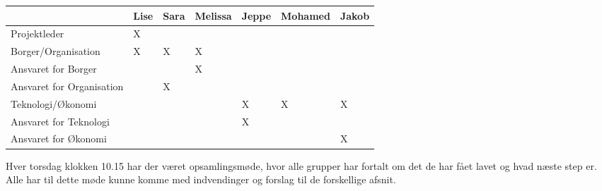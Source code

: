 \begin{table}[h]
\begin{tabular}{lllllll}
& Lise & Sara & Melissa &Jeppe &Mohamed & Jakob\\
\midrule
Projektleder & X & & & & &\\
\midrule
Borger/Organisation &X & X & X & & &\\
Ansvaret for Borger & &  & X& & &\\
Ansvaret for Organisation & & X&  & & &\\
\midrule
Teknologi/Økonomi & & & & X & X & X\\
Ansvaret for Teknologi & & & & X & &\\
Ansvaret for Økonomi & & & & & &X\\

\end{tabular}
\end{table} 

Hver torsdag klokken 10.15 har der været opsamlingsmøde, hvor alle grupper har fortalt om det de har fået lavet og hvad næste step er. Alle har til dette møde kunne komme med indvendinger og forslag til de forskellige afsnit.   
	

